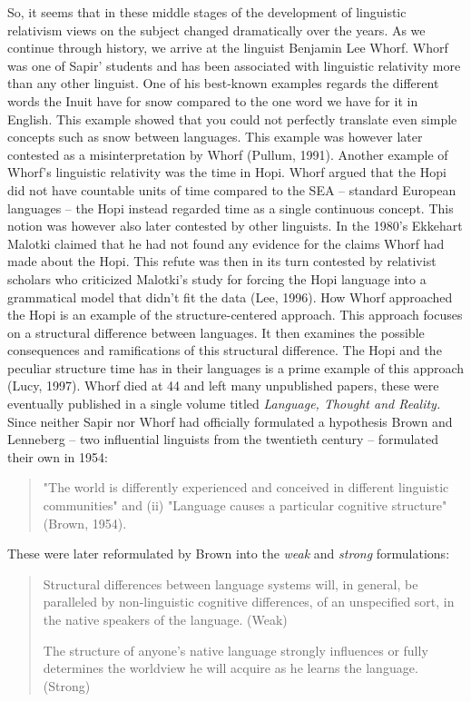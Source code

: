 So, it seems that in these middle stages of the development of linguistic relativism views on the subject changed dramatically over the years. As we continue through history, we arrive at the linguist Benjamin Lee Whorf. Whorf was one of Sapir’ students and has been associated with linguistic relativity more than any other linguist. One of his best-known examples regards the different words the Inuit have for snow compared to the one word we have for it in English. This example showed that you could not perfectly translate even simple concepts such as snow between languages. This example was however later contested as a misinterpretation by Whorf (Pullum, 1991). Another example of Whorf’s linguistic relativity was the time in Hopi. Whorf argued that the Hopi did not have countable units of time compared to the SEA – standard European languages – the Hopi instead regarded time as a single continuous concept. This notion was however also later contested by other linguists. In the 1980’s Ekkehart Malotki claimed that he had not found any evidence for the claims Whorf had made about the Hopi. This refute was then in its turn contested by relativist scholars who criticized Malotki’s study for forcing the Hopi language into a grammatical model that didn’t fit the data (Lee, 1996). How Whorf approached the Hopi is an example of the structure-centered approach. This approach focuses on a structural difference between languages. It then examines the possible consequences and ramifications of this structural difference. The Hopi and the peculiar structure time has in their languages is a prime example of this approach (Lucy, 1997).  Whorf died at 44 and left many unpublished papers, these were eventually published in a single volume titled \textit{Language, Thought and Reality.} Since neither Sapir nor Whorf had officially formulated a hypothesis Brown and Lenneberg – two influential linguists from the twentieth century – formulated their own in 1954:  

\begin{quote}
\begin{singlespace}
"The world is differently experienced and conceived in different linguistic communities" and (ii) "Language causes a particular cognitive structure" (Brown, 1954).
\end{singlespace}
\end{quote}

These were later reformulated by Brown into the \textit{weak} and \textit{strong} formulations: 

\begin{quote}
\begin{singlespace}
{Structural differences between language systems will, in general, be paralleled by non-linguistic cognitive differences, of an unspecified sort, in the native speakers of the language.} (Weak) 

{The structure of anyone's native language strongly influences or fully determines the worldview he will acquire as he learns the language. (Strong)} 

\end{singlespace}

\end{quote}

